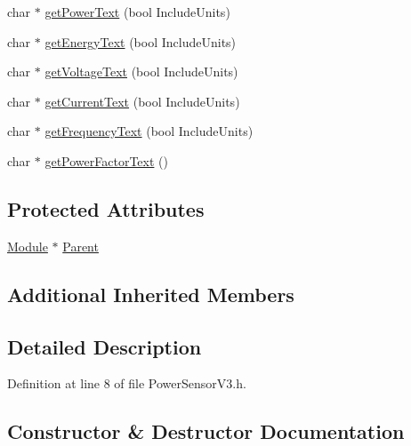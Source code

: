 \begin{DoxyCompactItemize}
\item 
char $\ast$ \hyperlink{class_power_sensor_v3_a3516af361f006c1bc23541c8b837d26c}{get\+Power\+Text} (bool Include\+Units)
\item 
char $\ast$ \hyperlink{class_power_sensor_v3_aa2d8c1dc0dd771e56eea4644b1a1b204}{get\+Energy\+Text} (bool Include\+Units)
\item 
char $\ast$ \hyperlink{class_power_sensor_v3_acd023ce18fb9a3f1530c722eb0f34eb1}{get\+Voltage\+Text} (bool Include\+Units)
\item 
char $\ast$ \hyperlink{class_power_sensor_v3_ab80cfb01e2669aeb2a57eb27d814ad21}{get\+Current\+Text} (bool Include\+Units)
\item 
char $\ast$ \hyperlink{class_power_sensor_v3_aa3b90af786459745e6ec6d87d1ad80ad}{get\+Frequency\+Text} (bool Include\+Units)
\item 
char $\ast$ \hyperlink{class_power_sensor_v3_a30dbbeda8f4694994b31dd423fee414e}{get\+Power\+Factor\+Text} ()
\end{DoxyCompactItemize}
\subsection*{Protected Attributes}
\begin{DoxyCompactItemize}
\item 
\hyperlink{class_module}{Module} $\ast$ \hyperlink{class_power_sensor_v3_aa7a23932f754042ad07e654a408e8a52}{Parent}
\end{DoxyCompactItemize}
\subsection*{Additional Inherited Members}


\subsection{Detailed Description}


Definition at line 8 of file Power\+Sensor\+V3.\+h.



\subsection{Constructor \& Destructor Documentation}
\mbox{\label{class_power_sensor_v3_a254a0502c2a42a5ccff07147a8a6ccfc}} 
